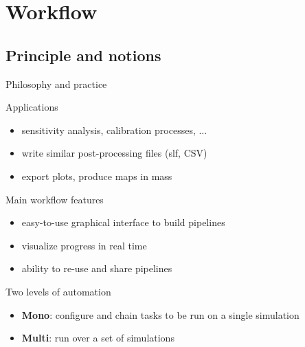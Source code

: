 \section{Workflow}

\subsection{Principle and notions}

\begin{frame}{Philosophy and practice}

  \begin{block}{Applications}
    \begin{itemize}
      \item sensitivity analysis, calibration processes, ...
      \item write similar post-processing files (slf, CSV)
      \item export plots, produce maps in mass
    \end{itemize}
  \end{block}
  \pause

  \begin{block}{Main workflow features}
    \begin{itemize}
      \item easy-to-use graphical interface to build pipelines
      \item visualize progress in real time
      \item ability to re-use and share pipelines
    \end{itemize}
  \end{block}
  \pause

  \begin{block}{Two levels of automation}
    \begin{itemize}
      \item \textbf{Mono}: configure and chain tasks to be run on a single simulation
      \item \textbf{Multi}: run over a set of simulations
    \end{itemize}
  \end{block}
\end{frame}


